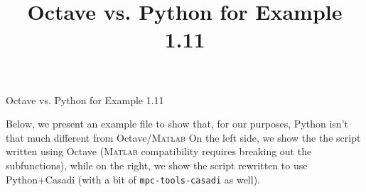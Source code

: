 \documentclass{article}
\title{Octave vs. Python for Example 1.11}
\begin{document}

\begin{center}
    \LARGE Octave vs. Python for Example 1.11
\end{center}

Below, we present an example file to show that, for our purposes, Python isn't that much different from Octave/\textsc{Matlab}
On the left side, we show the the script written using Octave (\textsc{Matlab} compatibility requires breaking out the subfunctions), while on the right, we show the script rewritten to use Python+Casadi (with a bit of \texttt{mpc-tools-casadi} as well).

\hspace{1em}


\end{document}
